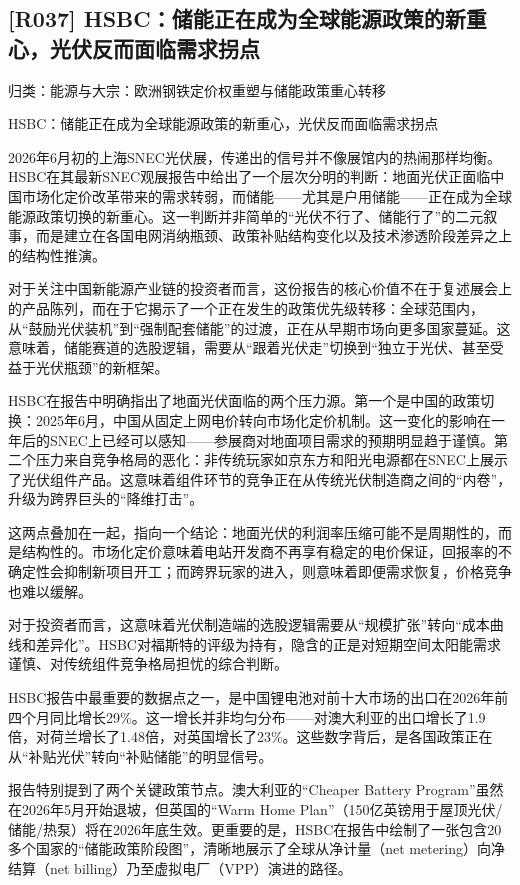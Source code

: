 \documentclass[11pt]{ctexart}
\begin{document}
\subsection{[R037] HSBC：储能正在成为全球能源政策的新重心，光伏反而面临需求拐点}
{\small\color{refgray}归类：能源与大宗：欧洲钢铁定价权重塑与储能政策重心转移}

HSBC：储能正在成为全球能源政策的新重心，光伏反而面临需求拐点

2026年6月初的上海SNEC光伏展，传递出的信号并不像展馆内的热闹那样均衡。HSBC在其最新SNEC观展报告中给出了一个层次分明的判断：地面光伏正面临中国市场化定价改革带来的需求转弱，而储能——尤其是户用储能——正在成为全球能源政策切换的新重心。这一判断并非简单的“光伏不行了、储能行了”的二元叙事，而是建立在各国电网消纳瓶颈、政策补贴结构变化以及技术渗透阶段差异之上的结构性推演。

对于关注中国新能源产业链的投资者而言，这份报告的核心价值不在于复述展会上的产品陈列，而在于它揭示了一个正在发生的政策优先级转移：全球范围内，从“鼓励光伏装机”到“强制配套储能”的过渡，正在从早期市场向更多国家蔓延。这意味着，储能赛道的选股逻辑，需要从“跟着光伏走”切换到“独立于光伏、甚至受益于光伏瓶颈”的新框架。

HSBC在报告中明确指出了地面光伏面临的两个压力源。第一个是中国的政策切换：2025年6月，中国从固定上网电价转向市场化定价机制。这一变化的影响在一年后的SNEC上已经可以感知——参展商对地面项目需求的预期明显趋于谨慎。第二个压力来自竞争格局的恶化：非传统玩家如京东方和阳光电源都在SNEC上展示了光伏组件产品。这意味着组件环节的竞争正在从传统光伏制造商之间的“内卷”，升级为跨界巨头的“降维打击”。

这两点叠加在一起，指向一个结论：地面光伏的利润率压缩可能不是周期性的，而是结构性的。市场化定价意味着电站开发商不再享有稳定的电价保证，回报率的不确定性会抑制新项目开工；而跨界玩家的进入，则意味着即便需求恢复，价格竞争也难以缓解。

对于投资者而言，这意味着光伏制造端的选股逻辑需要从“规模扩张”转向“成本曲线和差异化”。HSBC对福斯特的评级为持有，隐含的正是对短期空间太阳能需求谨慎、对传统组件竞争格局担忧的综合判断。

HSBC报告中最重要的数据点之一，是中国锂电池对前十大市场的出口在2026年前四个月同比增长29\%。这一增长并非均匀分布——对澳大利亚的出口增长了1.9倍，对荷兰增长了1.48倍，对英国增长了23\%。这些数字背后，是各国政策正在从“补贴光伏”转向“补贴储能”的明显信号。

报告特别提到了两个关键政策节点。澳大利亚的“Cheaper Battery Program”虽然在2026年5月开始退坡，但英国的“Warm Home Plan”（150亿英镑用于屋顶光伏/储能/热泵）将在2026年底生效。更重要的是，HSBC在报告中绘制了一张包含20多个国家的“储能政策阶段图”，清晰地展示了全球从净计量（net metering）向净结算（net billing）乃至虚拟电厂（VPP）演进的路径。
\end{document}
